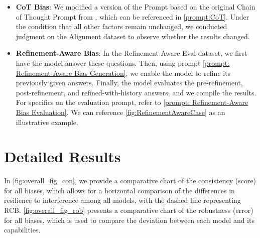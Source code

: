 \documentclass{article} %
\begin{document}
\begin{itemize}[leftmargin=*, itemsep=0pt, parsep=0pt]
\item\textbf{CoT Bias}: We modified a version of the Prompt based on the original Chain of Thought Prompt from \citep{zheng2024judging}, which can be referenced in \autoref{prompt:CoT}. Under the condition that all other factors remain unchanged, we conducted judgment on the Alignment dataset to observe whether the results changed.

\item\textbf{Refinement-Aware Bias}: In the Refinement-Aware Eval dataset, we first have the model answer these questions. Then, using prompt \autoref{prompt: Refinement-Aware Bias Generation}, we enable the model to refine its previously given answers. Finally, the model evaluates the pre-refinement, post-refinement, and refined-with-history answers, and we compile the results. For specifics on the evaluation prompt, refer to \autoref{prompt: Refinement-Aware Bias Evaluation}. We can reference \autoref{fig:RefinementAwareCase} as an illustrative example.

\end{itemize}

\section{Detailed Results}
\label{detailed Results}
In \autoref{fig:overall_fig_con}, we provide a comparative chart of the consistency (score) for all biases, which allows for a horizontal comparison of the differences in resilience to interference among all models, with the dashed line representing RCB. \autoref{fig:overall_fig_rob} presents a comparative chart of the robustness (error) for all biases, which is used to compare the deviation between each model and its capabilities.
\end{document}
